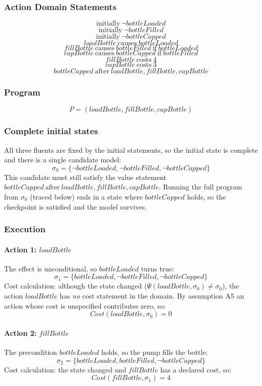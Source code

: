 \documentclass[11pt]{article}
\begin{document}
\subsubsection*{Action Domain Statements}
\[
\text{initially}~ \neg bottleLoaded
\]
\[
\text{initially}~ \neg bottleFilled
\]
\[
\text{initially}~ \neg bottleCapped
\]
\[
loadBottle ~\text{causes}~ bottleLoaded
\]
\[
fillBottle ~\text{causes}~ bottleFilled ~\text{if}~ bottleLoaded
\]
\[
capBottle ~\text{causes}~ bottleCapped ~\text{if}~ bottleFilled
\]
\[
fillBottle ~\text{costs}~ 4
\]
\[
capBottle ~\text{costs}~ 3
\]
\[
bottleCapped ~\text{after}~ loadBottle, fillBottle, capBottle
\]
\subsubsection*{Program}
\[
P = (loadBottle, fillBottle, capBottle)
\]
\subsubsection*{Complete initial states}
All three fluents are fixed by the initial statements, so the initial state is complete and there is a single candidate model:
\[
\sigma_0 = \{\neg bottleLoaded, \neg bottleFilled, \neg bottleCapped\}
\]
This candidate must still satisfy the value statement $bottleCapped ~\text{after}~ loadBottle, fillBottle, capBottle$. Running the full program from $\sigma_0$ (traced below) ends in a state where $bottleCapped$ holds, so the checkpoint is satisfied and the model survives.
\subsubsection*{Execution}
\paragraph{Action 1: $loadBottle$}
The effect is unconditional, so $bottleLoaded$ turns true:
\[
\sigma_1 = \{bottleLoaded, \neg bottleFilled, \neg bottleCapped\}
\]
Cost calculation: although the state changed ($\Psi(loadBottle, \sigma_0) \neq \sigma_0$), the action $loadBottle$ has \emph{no} cost statement in the domain. By assumption A5 an action whose cost is unspecified contributes zero, so:
\[
Cost(loadBottle, \sigma_0) = 0
\]
\paragraph{Action 2: $fillBottle$}
The precondition $bottleLoaded$ holds, so the pump fills the bottle:
\[
\sigma_2 = \{bottleLoaded, bottleFilled, \neg bottleCapped\}
\]
Cost calculation: the state changed and $fillBottle$ has a declared cost, so:
\[
Cost(fillBottle, \sigma_1) = 4
\]
\end{document}
